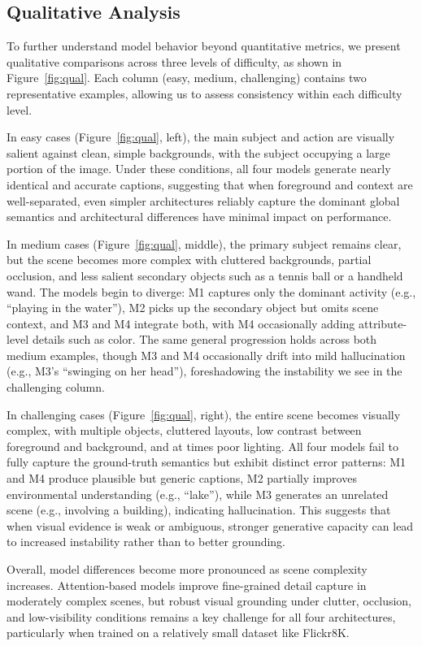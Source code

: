 \documentclass[10pt,twocolumn,letterpaper]{article}
\begin{document}
\subsection{Qualitative Analysis}
To further understand model behavior beyond quantitative metrics, we
present qualitative comparisons across three levels of difficulty,
as shown in Figure~\ref{fig:qual}. Each column (easy, medium,
challenging) contains two representative examples, allowing us to
assess consistency within each difficulty level.

In easy cases (Figure~\ref{fig:qual}, left), the main subject and
action are visually salient against clean, simple backgrounds, with
the subject occupying a large portion of the image. Under these
conditions, all four models generate nearly identical and accurate
captions, suggesting that when foreground and context are
well-separated, even simpler architectures reliably capture the
dominant global semantics and architectural differences have
minimal impact on performance.

In medium cases (Figure~\ref{fig:qual}, middle), the primary subject
remains clear, but the scene becomes more complex with cluttered
backgrounds, partial occlusion, and less salient secondary objects
such as a tennis ball or a handheld wand. The models begin to
diverge: M1 captures only the dominant activity (e.g., ``playing in
the water''), M2 picks up the secondary object but omits scene
context, and M3 and M4 integrate both, with M4 occasionally adding
attribute-level details such as color. The same general progression
holds across both medium examples, though M3 and M4 occasionally
drift into mild hallucination (e.g., M3's ``swinging on her head''),
foreshadowing the instability we see in the challenging column.

In challenging cases (Figure~\ref{fig:qual}, right), the entire
scene becomes visually complex, with multiple objects, cluttered
layouts, low contrast between foreground and background, and at
times poor lighting. All four models fail to fully capture the
ground-truth semantics but exhibit distinct error patterns: M1 and
M4 produce plausible but generic captions, M2 partially improves
environmental understanding (e.g., ``lake''), while M3 generates an
unrelated scene (e.g., involving a building), indicating
hallucination. This suggests that when visual evidence is weak or
ambiguous, stronger generative capacity can lead to increased
instability rather than to better grounding.

Overall, model differences become more pronounced as scene
complexity increases. Attention-based models improve fine-grained
detail capture in moderately complex scenes, but robust visual
grounding under clutter, occlusion, and low-visibility conditions
remains a key challenge for all four architectures, particularly
when trained on a relatively small dataset like Flickr8K.
\end{document}
